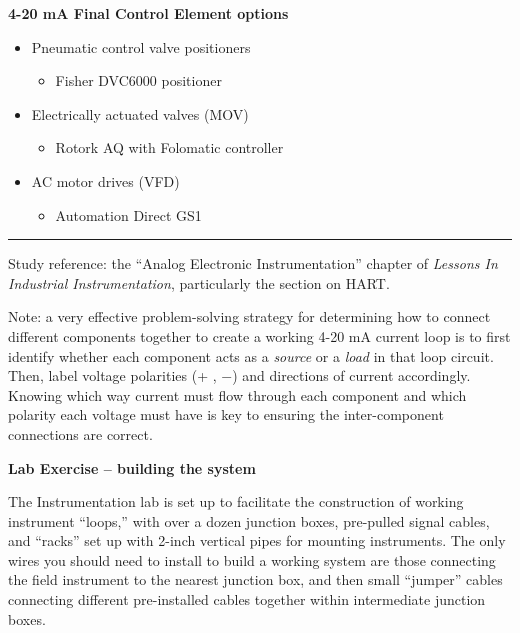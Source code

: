 \documentclass[12pt,a4paper]{article}
\begin{document}
\begin{itemize}
{{{{\noindent \centerline{\bf 4-20 mA Final Control Element options}
\begin{itemize}
\item{} Pneumatic control valve positioners
\begin{itemize}

\item{} Fisher DVC6000 positioner 
\end{itemize}
\vskip 2pt
\item{} Electrically actuated valves (MOV)
\begin{itemize}

\item{} Rotork AQ with Folomatic controller 
\end{itemize}
\vskip 2pt
\item{} AC motor drives (VFD)
\begin{itemize}

\item{} Automation Direct GS1 
\end{itemize}
\end{itemize}

} \hskip 3pt}%
\vskip 5pt \hrule}%
\vrule}


\vfil

Study reference: the ``Analog Electronic Instrumentation'' chapter of {\it Lessons In Industrial Instrumentation}, particularly the section on HART.

\vskip 10pt

Note: a very effective problem-solving strategy for determining how to connect different components together to create a working 4-20 mA current loop is to first identify whether each component acts as a {\it source} or a {\it load} in that loop circuit.  Then, label voltage polarities (+ , $-$) and directions of current accordingly.  Knowing which way current must flow through each component and which polarity each voltage must have is key to ensuring the inter-component connections are correct.







\vfil \eject

\noindent
{\bf Lab Exercise -- building the system}

\vskip 5pt

The Instrumentation lab is set up to facilitate the construction of working instrument ``loops,'' with over a dozen junction boxes, pre-pulled signal cables, and ``racks'' set up with 2-inch vertical pipes for mounting instruments.  The only wires you should need to install to build a working system are those connecting the field instrument to the nearest junction box, and then small ``jumper'' cables connecting different pre-installed cables together within intermediate junction boxes.


\end{itemize}
\end{document}
